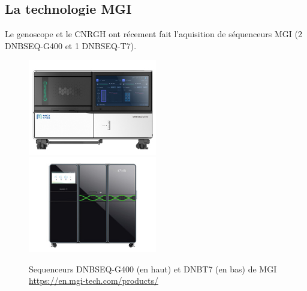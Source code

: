 \subsection{La technologie MGI}
Le genoscope et le CNRGH ont récement fait l'aquisition de séquenceurs MGI (2 DNBSEQ-G400 et 1 DNBSEQ-T7).

\begin{minipage}{0.45\textwidth}
    \begin{figure}[H]
        \centering
        \includegraphics[width=0.5\textwidth]{img/MGI_G400.jpg}\\
        \includegraphics[width=0.5\textwidth]{img/MGI_T7.jpg}
        \caption{\footnotesize{Sequenceurs DNBSEQ-G400 (en haut) et DNBT7 (en bas) de MGI \href{https://en.mgi-tech.com/products/}{https://en.mgi-tech.com/products/}}}
        \label{seq-MGI}
    \end{figure}
\end{minipage} 
\hfill
